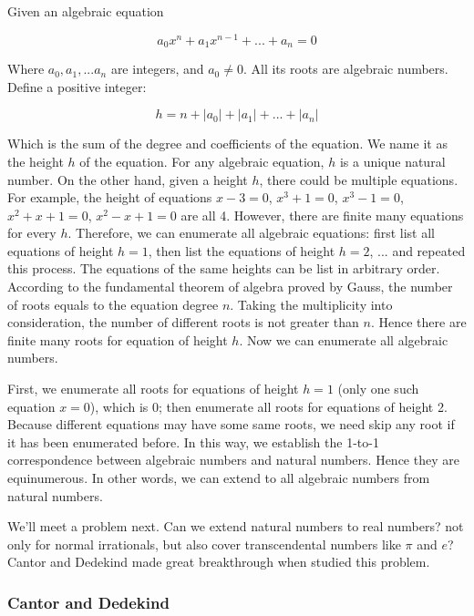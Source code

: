 \documentclass{article}
\begin{document}
\begin{enumerate}
Given an algebraic equation

\[
a_0 x^n + a_1 x^{n-1} + ... + a_n = 0
\]

Where $a_0, a_1, ... a_n$ are integers, and $a_0 \neq 0$. All its roots are algebraic numbers. Define a positive integer:

\[
h = n + |a_0| + |a_1| + ... + |a_n|
\]

Which is the sum of the degree and coefficients of the equation. We name it as the height $h$ of the equation. For any algebraic equation, $h$ is a unique natural number. On the other hand, given a height $h$, there could be multiple equations. For example, the height of equations $x - 3 = 0$, $x^3 + 1 = 0$, $x^3 - 1 = 0$, $x^2 + x + 1 = 0$, $x^2 - x + 1 = 0$ are all 4. However, there are finite many equations for every $h$. Therefore, we can enumerate all algebraic equations: first list all equations of height $h=1$, then list the equations of height $h=2$, ... and repeated this process. The equations of the same heights can be list in arbitrary order. According to the fundamental theorem of algebra proved by Gauss, the number of roots equals to the equation degree $n$. Taking the multiplicity into consideration, the number of different roots is not greater than $n$. Hence there are finite many roots for equation of height $h$. Now we can enumerate all algebraic numbers.

First, we enumerate all roots for equations of height $h=1$ (only one such equation $x = 0$), which is 0; then enumerate all roots for equations of height 2. Because different equations may have some same roots, we need skip any root if it has been enumerated before. In this way, we establish the 1-to-1 correspondence between algebraic numbers and natural numbers. Hence they are equinumerous. In other words, we can extend to all algebraic numbers from natural numbers.
\end{enumerate}

We'll meet a problem next. Can we extend natural numbers to real numbers? not only for normal irrationals, but also cover transcendental numbers like $\pi$ and $e$? Cantor and Dedekind made great breakthrough when studied this problem.

\subsubsection{Cantor and Dedekind}
\end{document}
